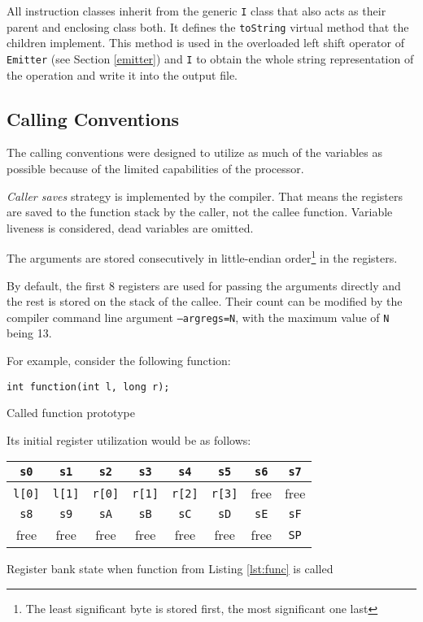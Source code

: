     All instruction classes inherit from the generic \texttt{I} class that also acts as their parent and enclosing class both. It defines the \texttt{toString} virtual method that the children implement. This method is used in the overloaded left shift operator of \texttt{Emitter} (see Section \ref{emitter}) and \texttt{I} to obtain the whole string representation of the operation and write it into the output file.

        \subsection{Calling Conventions}\label{callconv}

        The calling conventions were designed to utilize as much of the variables as possible because of the limited capabilities of the processor.

        \emph{Caller saves} strategy is implemented by the compiler. That means the registers are saved to the function stack by the caller, not the callee function. Variable liveness is considered, dead variables are omitted.

        The arguments are stored consecutively in little-endian order\footnote{The least significant byte is stored first, the most significant one last} in the registers.

        By default, the first 8 registers are used for passing the arguments directly and the rest is stored on the stack of the callee. Their count can be modified by the compiler command line argument \texttt{--argregs=N}, with the maximum value of \texttt{N} being 13.

        For example, consider the following function:

        \begin{listing}
        \centering
        \texttt{int function(int l, long r);}
        \caption{Called function prototype}\label{lst:func}
        \end{listing}

        Its initial register utilization would be as follows:

        \begin{listing}
        \centering
        \begin{tabular}{ | c | c | c | c | c | c | c | c | }
            \hline
            \texttt{s0} & \texttt{s1} & \texttt{s2} & \texttt{s3} & \texttt{s4} & \texttt{s5} & \texttt{s6} & \texttt{s7} \\
            \hline
            \texttt{l[0]} & \texttt{l[1]} & \texttt{r[0]} & \texttt{r[1]} & \texttt{r[2]} & \texttt{r[3]} & free & free \\
            \hline
            \hline
            \texttt{s8} & \texttt{s9} & \texttt{sA} & \texttt{sB} & \texttt{sC} & \texttt{sD} & \texttt{sE} & \texttt{sF} \\
            \hline
            free & free & free & free & free & free & free & \texttt{SP} \\
            \hline
        \end{tabular}
        \caption{Register bank state when function from Listing \ref{lst:func} is called}\label{lst:regs}
        \end{listing}

